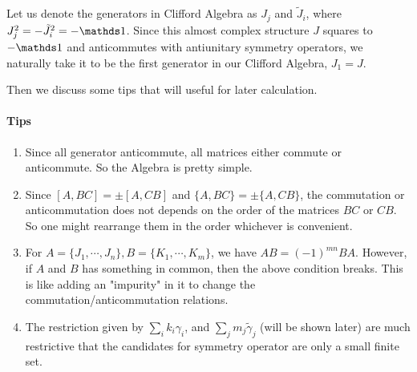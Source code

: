 \documentclass{article}
\begin{document}
Let us denote the generators in Clifford Algebra as $J_j$ and $\tilde{J}_i$,
where $J_j^2=-\tilde{J}_i^2 =-\id$. Since this almost complex structure $J$
squares to $-\id$ and anticommutes with antiunitary symmetry operators, we
naturally take it to be the first generator in our Clifford Algebra, $J_1=J$.

Then we discuss some tips that will useful for later calculation.
\paragraph{Tips}
\begin{enumerate}
    \item Since all generator anticommute, all matrices either commute or
        anticommute. So the Algebra is pretty simple.
    \item Since $[A,BC] = \pm[A,CB]$ and $\{A,BC\}=\pm\{A,CB\}$, the commutation
        or anticommutation does not depends on the order of the matrices $BC$ or
        $CB$. So one might rearrange them in the order whichever is convenient.
    \item For $A=\{J_1,\cdots,J_n\},B=\{K_1,\cdots,K_m\}$, we have $AB=(-1)^{mn}
        BA$. However, if $A$ and $B$ has something in common, then the above
        condition breaks. This is like adding an "impurity" in it to change the
        commutation/anticommutation relations.
    \item The restriction given by $\sum_i k_i \gamma_i$, and $\sum_j m_j
        \tilde{\gamma}_j$ (will be shown later) are much restrictive that the
        candidates for symmetry operator are only a small finite set.
        \label{enum:tips-4}
\end{enumerate}
\end{document}
